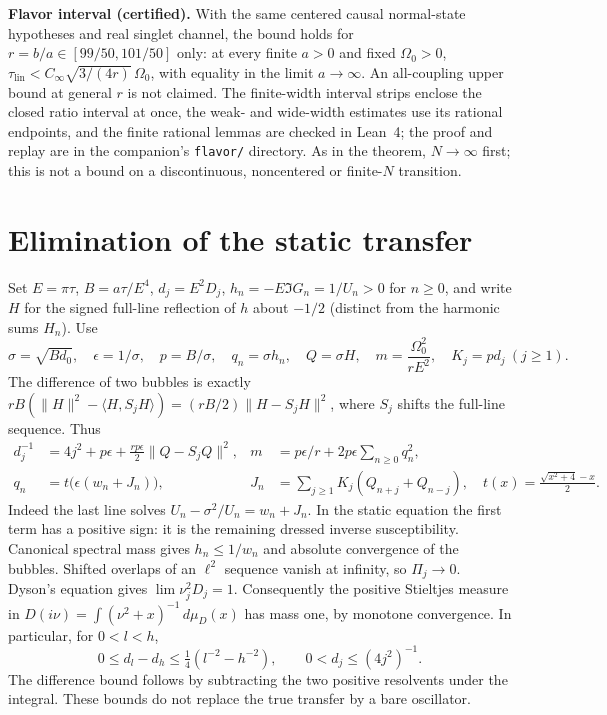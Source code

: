 \documentclass[11pt]{article}
\newcommand{\lin}{\mathrm{lin}}
\begin{document}
\noindent\textbf{Flavor interval (certified).} With the same centered causal normal-state hypotheses and real singlet channel, the bound holds for $r=b/a\in[99/50,101/50]$ only: at every finite $a>0$ and fixed $\Omega_0>0$, $\tau_{\lin}<C_\infty\sqrt{3/(4r)}\,\Omega_0$, with equality in the limit $a\to\infty$. An all-coupling upper bound at general $r$ is not claimed. The finite-width interval strips enclose the closed ratio interval at once, the weak- and wide-width estimates use its rational endpoints, and the finite rational lemmas are checked in Lean~4; the proof and replay are in the companion's \texttt{flavor/} directory. As in the theorem, $N\to\infty$ first; this is not a bound on a discontinuous, noncentered or finite-$N$ transition.

\section{Elimination of the static transfer}
Set $E=\pi\tau$, $B=a\tau/E^4$, $d_j=E^2D_j$, $h_n=-E\Im G_n=1/U_n>0$ for $n\ge0$, and write $H$ for the signed full-line reflection of $h$ about $-1/2$ (distinct from the harmonic sums $H_n$). Use
\[
 \sigma=\sqrt{Bd_0},\quad \epsilon=1/\sigma,\quad p=B/\sigma,\quad q_n=\sigma h_n,\quad Q=\sigma H,\quad m=\frac{\Omega_0^2}{rE^2},\quad K_j=pd_j\ (j\ge1).
\]
The difference of two bubbles is exactly $rB(\|H\|^2-\langle H,S_jH\rangle)=(rB/2)\|H-S_jH\|^2$, where $S_j$ shifts the full-line sequence. Thus
\begin{equation}\label{eq:scaled}
\begin{aligned}
 d_j^{-1}&=4j^2+p\epsilon+\frac{rp\epsilon}{2}\|Q-S_jQ\|^2, &
 m&=p\epsilon/r+2p\epsilon\sum_{n\ge0}q_n^2,\\
 q_n&=t\big(\epsilon(w_n+J_n)\big), &
 J_n&=\sum_{j\ge1}K_j(Q_{n+j}+Q_{n-j}),\quad t(x)=\frac{\sqrt{x^2+4}-x}{2}.
\end{aligned}
\end{equation}
Indeed the last line solves $U_n-\sigma^2/U_n=w_n+J_n$. In the static equation the first term has a positive sign: it is the remaining dressed inverse susceptibility. Canonical spectral mass gives $h_n\le1/w_n$ and absolute convergence of the bubbles. Shifted overlaps of an $\ell^2$ sequence vanish at infinity, so $\Pi_j\to0$. Dyson's equation gives $\lim\nu_j^2D_j=1$. Consequently the positive Stieltjes measure in $D(i\nu)=\int(\nu^2+x)^{-1}\,d\mu_D(x)$ has mass one, by monotone convergence. In particular, for $0<l<h$,
\begin{equation}\label{eq:stiel}
 0\le d_l-d_h\le\tfrac14(l^{-2}-h^{-2}),\qquad 0<d_j\le(4j^2)^{-1}.
\end{equation}
The difference bound follows by subtracting the two positive resolvents under the integral. These bounds do not replace the true transfer by a bare oscillator.
\end{document}
